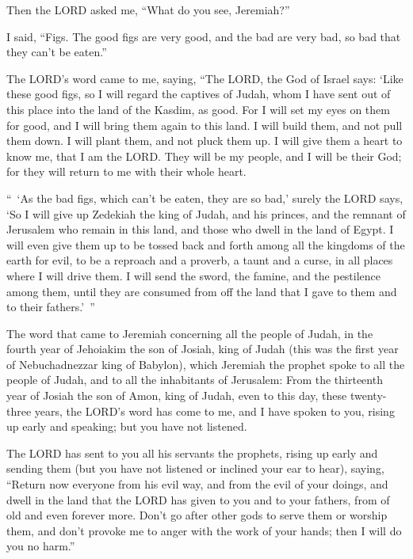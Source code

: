 \myverse{}Then the LORD asked me, “What do you see, Jeremiah?”

I said, “Figs. The good figs are very good, and the bad are very bad, so bad that they can’t
be eaten.”


\myverse{}The LORD’s word came to me, saying, \myverse{}“The LORD, the God of Israel says: ‘Like these good figs, so I will regard the captives of Judah, whom I have sent out of this place into the land of the Kasdim, as good. \myverse{}For I will set my eyes on them for good, and I will bring them again to this land. I will build them, and not pull them down. I will plant them, and not pluck them up. \myverse{}I will give them a heart to know me, that I am the LORD. They will be my people, and I will be their God; for they will return to me with their whole heart.


\myverse{}“ ‘As the bad figs, which can’t be eaten, they are so bad,’ surely the LORD says, ‘So I will give up Zedekiah the king of Judah, and his princes, and the remnant of Jerusalem who remain in this land, and those who dwell in the land of Egypt. \myverse{}I will even give them up to be tossed back and forth among all the kingdoms of the earth for evil, to be a reproach and a proverb, a taunt and a curse, in all places where I will drive them. \myverse{}I will send the sword, the famine, and the pestilence among them, until they are consumed from off the land that I gave to them and to their fathers.’ ”


\mychapter{} \myverse*{}The word that came to Jeremiah concerning all the people of Judah, in the fourth year of Jehoiakim the son of Josiah, king of Judah (this was the first year of Nebuchadnezzar king of Babylon), \myverse{}which Jeremiah the prophet spoke to all the people of Judah, and to all the inhabitants of Jerusalem: \myverse{}From the thirteenth year of Josiah the son of Amon, king of Judah, even to this day, these twenty-three years, the LORD’s word has come to me, and I have spoken to you, rising up early and speaking; but you have not listened.


\myverse{}The LORD has sent to you all his servants the prophets, rising up early and sending them (but you have not listened or inclined your ear to hear), \myverse{}saying, “Return now everyone from his evil way, and from the evil of your doings, and dwell in the land that the LORD has given to you and to your fathers, from of old and even forever more. \myverse{}Don’t go after other gods to serve them or worship them, and don’t provoke me to anger with the work of your hands; then I will do you no harm.”


